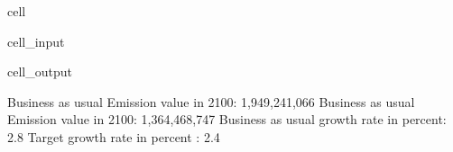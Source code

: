\documentclass[letterpaper,10pt,english]{jupyterBook}
\begin{document}
\begin{sphinxuseclass}{cell}
\begin{sphinxVerbatimInput}
\begin{sphinxuseclass}{cell_input}
\end{sphinxuseclass}\end{sphinxVerbatimInput}
\begin{sphinxVerbatimOutput}

\begin{sphinxuseclass}{cell_output}
\begin{sphinxVerbatim}[commandchars=\\\{\}]
Business as usual Emission value in 2100: 1,949,241,066
Business as usual Emission value in 2100: 1,364,468,747
Business as usual growth rate in percent:          2.8\PYGZpc{}
Target growth rate in percent           :          2.4\PYGZpc{}
\end{sphinxVerbatim}

\end{sphinxuseclass}\end{sphinxVerbatimOutput}

\end{sphinxuseclass}
\end{document}
